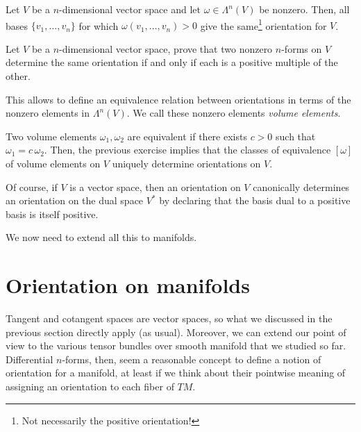 \begin{lemma}\label{lemma:orient}
	Let $V$ be a $n$-dimensional vector space and let $\omega\in\Lambda^n(V)$ be nonzero.
	Then, all bases $\{v_1, \ldots, v_n\}$ for which $\omega(v_1,\ldots, v_n) > 0$ give the same\footnote{Not necessarily the positive orientation!} orientation for $V$.
\end{lemma}

\begin{exercise}
	Let $V$ be a $n$-dimensional vector space, prove that two nonzero $n$-forms on $V$ determine the same orientation if and only if each is a positive multiple of the other.
\end{exercise}

This allows to define an equivalence relation between orientations in terms of the nonzero elements in $\Lambda^n(V)$. We call these nonzero elements \emph{volume elements}.

Two volume elements $\omega_1, \omega_2$ are equivalent if there exists $c > 0$ such that $\omega_1 = c\, \omega_2$.
Then, the previous exercise implies that the classes of equivalence $[\omega]$ of volume elements on $V$ uniquely determine orientations on $V$.

\begin{remark}
	Of course, if $V$ is a vector space, then an orientation on $V$ canonically determines an orientation on the dual space $V^*$ by declaring that the basis dual to a positive basis is itself positive.
\end{remark}

We now need to extend all this to manifolds.

\section{Orientation on manifolds}
Tangent and cotangent spaces are vector spaces, so what we discussed in the previous section directly apply (as usual).
Moreover, we can extend our point of view to the various tensor bundles over smooth manifold that we studied so far.
Differential $n$-forms, then, seem a reasonable concept to define a notion of orientation for a manifold, at least if we think about their pointwise meaning of assigning an orientation to each fiber of $TM$.


